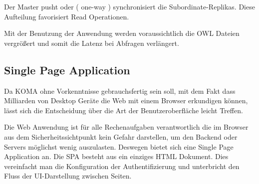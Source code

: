 \documentclass[
12pt,
english,
ngerman,
headsepline,
twoside,
openright,
numbers=noenddot,version=first
]{scrreprt}
\begin{document}
Der Master pusht oder ( one-way ) synchronisiert die Subordinate-Replikas. 
Diese Aufteilung favorisiert Read Operationen.
 
Mit der Benutzung der Anwendung werden voraussichtlich die \acrshort{OWL} Dateien vergrößert und somit die Latenz bei Abfragen verlängert.


















\subsection{Single Page Application}
\label{sec:spa}

Da KOMA ohne Vorkenntnisse gebrauchsfertig sein soll, mit dem Fakt dass Milliarden von Desktop Geräte die Web mit einem Browser erkundigen können, lässt sich die Entscheidung über die Art der Benutzeroberfläche leicht Treffen.

Die Web Anwendung ist für alle Rechenaufgaben verantwortlich die im Browser aus dem Sicherheitssichtpunkt kein Gefahr darstellen, um den Backend oder Servers möglichst wenig auszulasten. Deswegen bietet sich eine Single Page Application an. 
Die SPA besteht aus ein einziges HTML Dokument. Dies vereinfacht man die Konfiguration der Authentifizierung und unterbricht den Fluss der UI-Darstellung zwischen Seiten.
\end{document}

